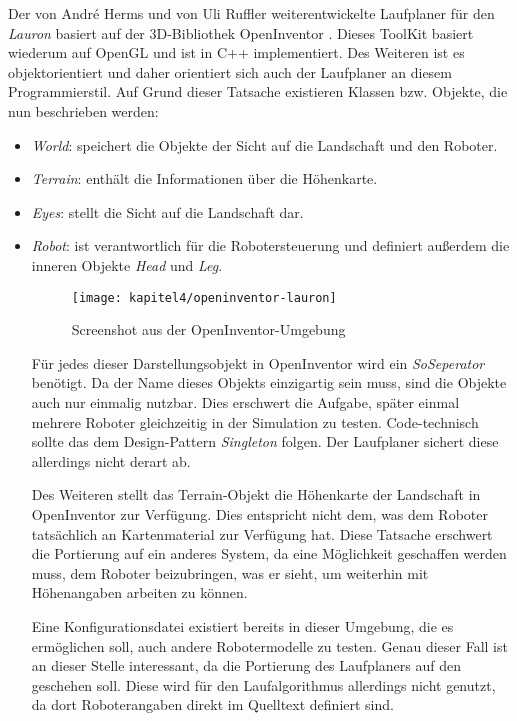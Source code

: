 Der von André Herms \autocite{herms2004} und von Uli Ruffler \autocite{ruffler2006} weiterentwickelte Laufplaner für den \emph{Lauron} basiert auf der 3D-Bibliothek OpenInventor \autocite{inventor}. Dieses ToolKit basiert wiederum auf OpenGL und ist in C++ implementiert. Des Weiteren ist es objektorientiert und daher orientiert sich auch der Laufplaner an diesem Programmierstil. Auf Grund dieser Tatsache existieren Klassen bzw. Objekte, die nun beschrieben werden:
\begin{itemize}
  \item \emph{World}: speichert die Objekte der Sicht auf die Landschaft und den Roboter. 
  \item \emph{Terrain}: enthält die Informationen über die Höhenkarte.
  \item \emph{Eyes}: stellt die Sicht auf die Landschaft dar.
  \item \emph{Robot}: ist verantwortlich für die Robotersteuerung und definiert außerdem die inneren Objekte \emph{Head} und \emph{Leg}.
  
\begin{figure}[t!]
  \centering
  \texttt{[image: kapitel4/openinventor-lauron]}
  \caption{Screenshot aus der OpenInventor-Umgebung}
  \label{Kap4:OpenInventorLauron}
\end{figure}

Für jedes dieser Darstellungsobjekt in OpenInventor wird ein \emph{SoSeperator} benötigt. Da der Name dieses Objekts einzigartig sein muss, sind die Objekte auch nur einmalig nutzbar. Dies erschwert die Aufgabe, später einmal mehrere Roboter gleichzeitig in der Simulation zu testen. Code-technisch sollte das dem Design-Pattern \emph{Singleton} folgen. Der Laufplaner sichert diese allerdings nicht derart ab.

Des Weiteren stellt das Terrain-Objekt die Höhenkarte der Landschaft in OpenInventor zur Verfügung. Dies entspricht nicht dem, was dem Roboter tatsächlich an Kartenmaterial zur Verfügung hat. Diese Tatsache erschwert die Portierung auf ein anderes System, da eine Möglichkeit geschaffen werden muss, dem Roboter beizubringen, was er sieht, um weiterhin mit Höhenangaben arbeiten zu können.

Eine Konfigurationsdatei existiert bereits in dieser Umgebung, die es ermöglichen soll, auch andere Robotermodelle zu testen. Genau dieser Fall ist an dieser Stelle interessant, da die Portierung des Laufplaners auf den  geschehen soll. Diese wird für den Laufalgorithmus allerdings nicht genutzt, da dort Roboterangaben direkt im Quelltext definiert sind.


\end{itemize}
